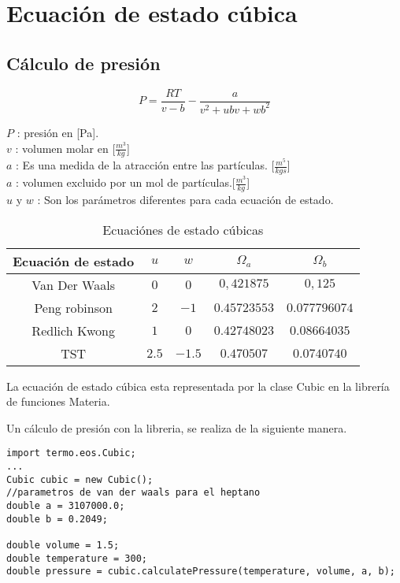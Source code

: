 \section{Ecuación de estado cúbica}
 
 \subsection{Cálculo de presión}
 \label{subsec:pressure}

\begin{equation}
	P = \frac{R T}{v-b} - \frac{a}{v^2 +u b v + w b^2 }
\end{equation}

{$P$} : presión en [Pa].\\
{$v$} : volumen molar en [$\frac{m^3}{kg}$]\\
{$a$} : Es una medida de la atracción entre las partículas. [$\frac{m^5}{kg s}$]\\
{$a$} : volumen excluido por un mol de partículas.[$\frac{m^3}{kg}$]\\
{$u $ y $w $} : Son los parámetros diferentes para cada ecuación de estado.\\

\begin{table}
\begin{tabular}{|c |c | c | c | c |}
	\hline
	Ecuación de estado  & $u$ & $w$ & $\Omega_a$&$\Omega_b$\\
	\hline
	Van Der Waals  & $0$ & $0$ & $0,421875$ & $0,125$\\
	\hline
	Peng robinson  & $2$ & $-1$ & $0.45723553$ & $0.077796074$\\
	\hline
	Redlich Kwong  & $1$ & $0$ & $0.42748023$ & $0.08664035$\\
	\hline
	TST  & $2.5$ & $-1.5$ &$ 0.470507$ & $0.0740740$\\
	\hline
\end{tabular}
\caption{Ecuaciónes de estado cúbicas}\label{tab:cubics}
\end{table}

La ecuación de estado cúbica esta representada por la clase Cubic en la librería de funciones Materia.

Un cálculo de presión con la libreria, se realiza de la siguiente manera.
\begin{lstlisting}[label=pressureCalculation,caption=Cálculo de presión para el heptano con la ecuación de estado cúbica de Van Der Waals]
import termo.eos.Cubic;
...
Cubic cubic = new Cubic();
//parametros de van der waals para el heptano
double a = 3107000.0;
double b = 0.2049;

double volume = 1.5;
double temperature = 300;
double pressure = cubic.calculatePressure(temperature, volume, a, b);
\end{lstlisting}

